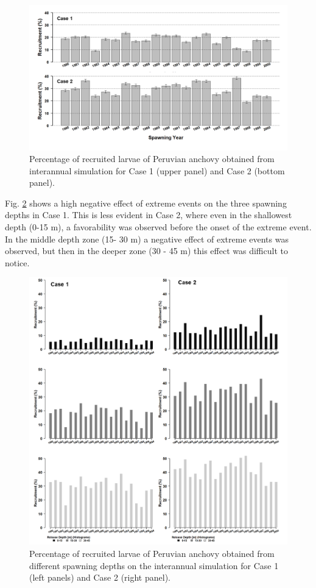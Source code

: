 \begin{figure}[ht]
	\includegraphics[width=1.0\textwidth]{figures/Fig3_12.png}
	\centering
	\caption{Percentage of recruited larvae of Peruvian anchovy obtained from interannual simulation for Case 1 (upper panel) and Case 2 (bottom panel).}
	\label{Fig3_12}
\end{figure}

Fig. \ref{Fig3_13} shows a high negative effect of extreme events on the three spawning depths in Case 1. This is less evident in Case 2, where even in the shallowest depth (0-15 m), a favorability was observed before the onset of the extreme event. In the middle depth zone (15- 30 m) a negative effect of extreme events was observed, but then in the deeper zone (30 - 45 m) this effect was difficult to notice.

\begin{figure}[ht]
	\includegraphics[width=1.0\textwidth]{figures/Fig3_13.png}
	\centering
	\caption{Percentage of recruited larvae of Peruvian anchovy obtained from different spawning depths on the interannual simulation for Case 1 (left panels) and Case 2 (right panel).}
	\label{Fig3_13}
\end{figure}

